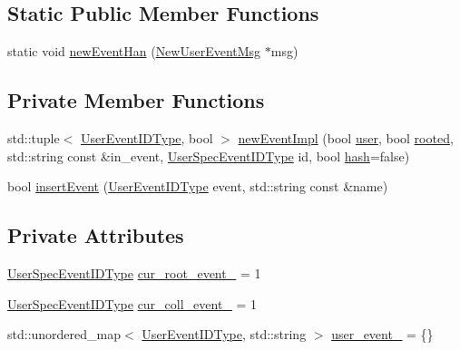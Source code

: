 \subsection*{Static Public Member Functions}
\begin{DoxyCompactItemize}
\item 
static void \hyperlink{structvt_1_1trace_1_1_user_event_registry_a314bba11008b65bce09a560d3107a5c5}{new\+Event\+Han} (\hyperlink{structvt_1_1trace_1_1_user_event_registry_1_1_new_user_event_msg}{New\+User\+Event\+Msg} $\ast$msg)
\end{DoxyCompactItemize}
\subsection*{Private Member Functions}
\begin{DoxyCompactItemize}
\item 
std\+::tuple$<$ \hyperlink{namespacevt_1_1trace_a5908920d051c144c89f17c69ed262350}{User\+Event\+I\+D\+Type}, bool $>$ \hyperlink{structvt_1_1trace_1_1_user_event_registry_ae3e2193c40fd3ff7de9367a02f9e457d}{new\+Event\+Impl} (bool \hyperlink{structvt_1_1trace_1_1_user_event_registry_a6a2156b87f22007a4a20ca1b7e96d2fe}{user}, bool \hyperlink{structvt_1_1trace_1_1_user_event_registry_a8b940e39914a9d3ba1acf0a219f6d44d}{rooted}, std\+::string const \&in\+\_\+event, \hyperlink{namespacevt_1_1trace_a70c43e0e1596eea236912d4197d3120a}{User\+Spec\+Event\+I\+D\+Type} id, bool \hyperlink{structvt_1_1trace_1_1_user_event_registry_a99ef8a7f7df7a11fac6ada816f83cfbf}{hash}=false)
\item 
bool \hyperlink{structvt_1_1trace_1_1_user_event_registry_a5322490b81bb736a4649e23d47fd374b}{insert\+Event} (\hyperlink{namespacevt_1_1trace_a5908920d051c144c89f17c69ed262350}{User\+Event\+I\+D\+Type} event, std\+::string const \&name)
\end{DoxyCompactItemize}
\subsection*{Private Attributes}
\begin{DoxyCompactItemize}
\item 
\hyperlink{namespacevt_1_1trace_a70c43e0e1596eea236912d4197d3120a}{User\+Spec\+Event\+I\+D\+Type} \hyperlink{structvt_1_1trace_1_1_user_event_registry_adbebc33d6c64eaee5f6c59be8482b833}{cur\+\_\+root\+\_\+event\+\_\+} = 1
\item 
\hyperlink{namespacevt_1_1trace_a70c43e0e1596eea236912d4197d3120a}{User\+Spec\+Event\+I\+D\+Type} \hyperlink{structvt_1_1trace_1_1_user_event_registry_a5aeb079091c716db207203ddea26b39d}{cur\+\_\+coll\+\_\+event\+\_\+} = 1
\item 
std\+::unordered\+\_\+map$<$ \hyperlink{namespacevt_1_1trace_a5908920d051c144c89f17c69ed262350}{User\+Event\+I\+D\+Type}, std\+::string $>$ \hyperlink{structvt_1_1trace_1_1_user_event_registry_a5756ec4a07f4624f2da1538afe1e553d}{user\+\_\+event\+\_\+} = \{\}
\end{DoxyCompactItemize}
